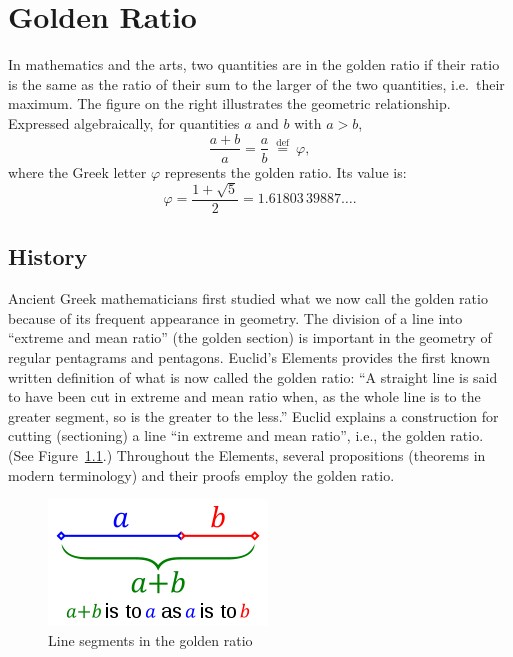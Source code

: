 \chapter{Golden Ratio}

In mathematics and the arts, two quantities are in the golden ratio if their ratio is the same as the ratio of their sum to the larger of the two quantities, i.e.~their maximum. The figure on the right illustrates the geometric relationship. Expressed algebraically, for quantities $a$ and $b$ with $a > b$,
\begin{equation}
 \frac{a+b}{a} = \frac{a}{b} \ \stackrel{\text{def}}{=}\ \varphi,
\end{equation}
where the Greek letter $\varphi$ represents the golden ratio. Its value is:
\begin{equation}
\varphi = \frac{1+\sqrt{5}}{2} = 1.61803\,39887\ldots.
\end{equation}

\section{History}

Ancient Greek mathematicians first studied what we now call the golden ratio because of its frequent appearance in geometry. The division of a line into ``extreme and mean ratio'' (the golden section) is important in the geometry of regular pentagrams and pentagons. Euclid's Elements  provides the first known written definition of what is now called the golden ratio: ``A straight line is said to have been cut in extreme and mean ratio when, as the whole line is to the greater segment, so is the greater to the less.'' Euclid explains a construction for cutting (sectioning) a line ``in extreme and mean ratio'', i.e., the golden ratio. (See Figure~\ref{fig:line:golden}.) Throughout the Elements, several propositions (theorems in modern terminology) and their proofs employ the golden ratio.

\begin{figure}[hbt!]\centering
\includegraphics[width=.3\textwidth]{220px-Golden-ratio-line}
\caption{Line segments in the golden ratio}
\label{fig:line:golden}
\end{figure}

